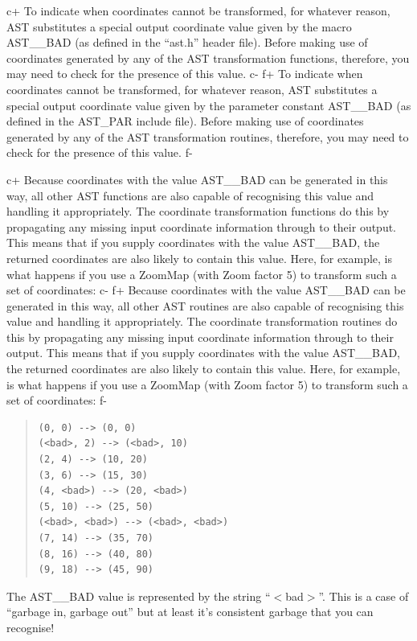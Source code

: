 \documentclass[twoside,11pt]{article}
\begin{document}
c+
To indicate when coordinates cannot be transformed, for whatever
reason, AST substitutes a special output coordinate value given by the
macro AST\_\_BAD (as defined in the ``ast.h'' header file).  Before
making use of coordinates generated by any of the AST transformation
functions, therefore, you may need to check for the presence of this
value.
c-
f+
To indicate when coordinates cannot be transformed, for whatever
reason, AST substitutes a special output coordinate value given by the
parameter constant AST\_\_BAD (as defined in the AST\_PAR include
file).  Before making use of coordinates generated by any of the AST
transformation routines, therefore, you may need to check for the
presence of this value.
f-

c+
Because coordinates with the value AST\_\_BAD can be generated in this
way, all other AST functions are also capable of recognising this
value and handling it appropriately. The coordinate transformation
functions do this by propagating any missing input coordinate
information through to their output.  This means that if you supply
coordinates with the value AST\_\_BAD, the returned coordinates are
also likely to contain this value. Here, for example, is what happens
if you use a ZoomMap (with Zoom factor 5) to transform such a set of
coordinates:
c-
f+
Because coordinates with the value AST\_\_BAD can be generated in this
way, all other AST routines are also capable of recognising this value
and handling it appropriately. The coordinate transformation routines
do this by propagating any missing input coordinate information
through to their output.  This means that if you supply coordinates
with the value AST\_\_BAD, the returned coordinates are also likely to
contain this value. Here, for example, is what happens if you use a
ZoomMap (with Zoom factor 5) to transform such a set of coordinates:
f-

\begin{quote}
\small
\begin{verbatim}
(0, 0) --> (0, 0)
(<bad>, 2) --> (<bad>, 10)
(2, 4) --> (10, 20)
(3, 6) --> (15, 30)
(4, <bad>) --> (20, <bad>)
(5, 10) --> (25, 50)
(<bad>, <bad>) --> (<bad>, <bad>)
(7, 14) --> (35, 70)
(8, 16) --> (40, 80)
(9, 18) --> (45, 90)
\end{verbatim}
\normalsize
\end{quote}

The AST\_\_BAD value is represented by the string ``$<$bad$>$''. This
is a case of ``garbage in, garbage out'' but at least it's consistent
garbage that you can recognise!
\end{document}
